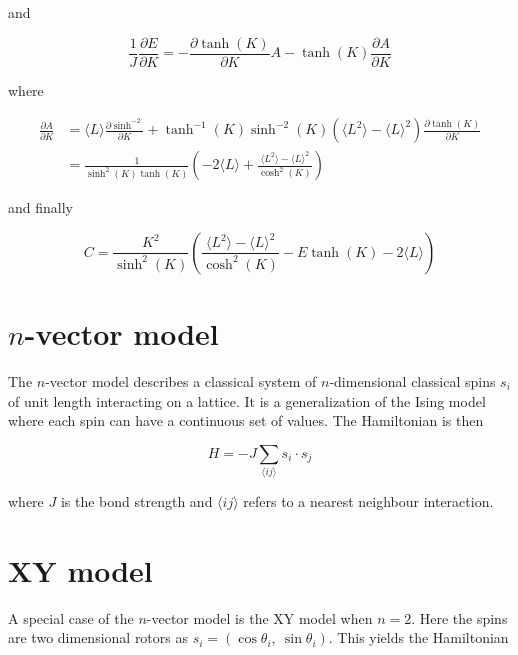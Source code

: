 and

\begin{equation}
    \frac{1}{J} \frac{\partial E}{\partial K} = - \frac{\partial \tanh(K)}{\partial K} A - \tanh(K) \frac{\partial A}{\partial K}
\end{equation}

where

\begin{align*}
    \frac{\partial A}{\partial K} &= \langle L \rangle \frac{\partial \sinh^{-2}}{\partial K} + \tanh^{-1}(K)\sinh^{-2}(K) \left ( \langle L^2 \rangle - \langle L \rangle^2 \right ) \frac{\partial \tanh(K)}{\partial K} \\
    &= \frac{1}{\sinh^2(K) \tanh(K)} \left (-2 \langle L \rangle + \frac{\langle L^2 \rangle - \langle L \rangle^2}{\cosh^2(K)} \right )
\end{align*}

and finally

\begin{equation}
    C = \frac{K^2}{\sinh^2(K)} \left ( \frac{\langle L^2 \rangle - \langle L \rangle^2}{\cosh^2(K)} - E \tanh(K) - 2 \langle L \rangle \right )
\end{equation}

\section{$n$-vector model}
\label{sec:nVector}

The $n$-vector model describes a classical system of $n$-dimensional classical spins $s_i$ of unit length interacting on a lattice. It is a generalization of the Ising model where each spin can have a continuous set of values. The Hamiltonian is then

\begin{equation}
    H = -J\sum_{\langle ij \rangle} s_i \cdot s_j
\end{equation}

where $J$ is the bond strength and $\langle ij \rangle$ refers to a nearest neighbour interaction.

\section{XY model}
\label{sec:XYModel}

A special case of the $n$-vector model is the XY model when $n = 2$. Here the spins are two dimensional rotors as $s_i = (\cos \theta_i, \  \sin \theta_i)$. This yields the Hamiltonian

